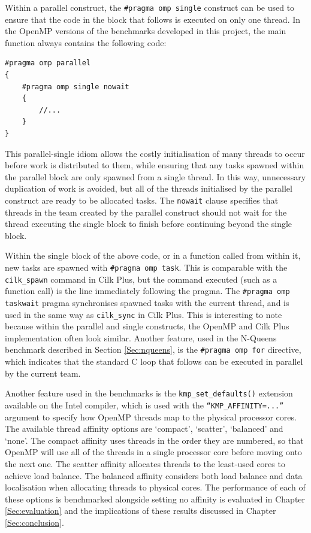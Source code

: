 \documentclass{report}
\newenvironment{mono}{\fontfamily{ttfamily}\selectfont}{\par}
\newenvironment{embedcode}{\begin{changemargin}{6em}{3em}\begin{mono}{}}{\end{mono}\end{changemargin}}
\begin{document}
Within a parallel construct, the \verb!#pragma omp single! construct can be used to ensure that the code in the block that follows is executed on only one thread. In the OpenMP versions of the benchmarks developed in this project, the main function always contains the following code:

\begin{embedcode}
\begin{verbatim}
#pragma omp parallel
{
    #pragma omp single nowait
    {
        //...
    }
}
\end{verbatim}
\end{embedcode}

This parallel-single idiom allows the costly initialisation of many threads to occur before work is distributed to them, while ensuring that any tasks spawned within the parallel block are only spawned from a single thread. In this way, unnecessary duplication of work is avoided, but all of the threads initialised by the parallel construct are ready to be allocated tasks. The \verb!nowait! clause specifies that threads in the team created by the parallel construct should not wait for the thread executing the single block to finish before continuing beyond the single block\cite{openmpspec}.

Within the single block of the above code, or in a function called from within it, new tasks are spawned with \verb!#pragma omp task!. This is comparable with the \verb!cilk_spawn! command in Cilk Plus, but the command executed (such as a function call) is the line immediately following the pragma. The \verb!#pragma omp taskwait! pragma synchronises spawned tasks with the current thread, and is used in the same way as \verb!cilk_sync! in Cilk Plus. This is interesting to note because within the parallel and single constructs, the OpenMP and Cilk Plus implementation often look similar. Another feature, used in the N-Queens benchmark described in Section \ref{Sec:nqueens}, is the \verb!#pragma omp for! directive, which indicates that the standard C loop that follows can be executed in parallel by the current team.

Another feature used in the benchmarks is the \verb!kmp_set_defaults()! extension available on the Intel compiler, which is used with the \verb!“KMP_AFFINITY=...”! argument to specify how OpenMP threads map to the physical processor cores\cite{openmpaffinity}. The available thread affinity options are `compact', `scatter', `balanced' and `none'\cite{Wang14}. The compact affinity uses threads in the order they are numbered, so that OpenMP will use all of the threads in a single processor core before moving onto the next one\cite{Wang14}. The scatter affinity allocates threads to the least-used cores to achieve load balance\cite{Wang14}. The balanced affinity considers both load balance and data localisation when allocating threads to physical cores\cite{Wang14}. The performance of each of these options is benchmarked alongside setting no affinity is evaluated in Chapter \ref{Sec:evaluation} and the implications of these results discussed in Chapter \ref{Sec:conclusion}.
\end{document}
